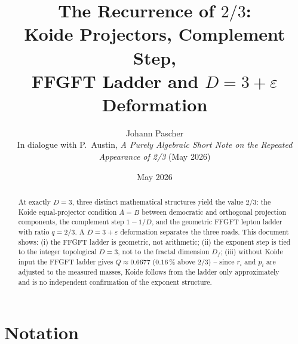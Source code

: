 
\title{The Recurrence of \(2/3\):\\[0.4em]
\large Koide Projectors, Complement Step,\\
FFGFT Ladder and \(D = 3+\varepsilon\) Deformation}
\author{Johann Pascher\\[0.3em]
\small In dialogue with P.~Austin,
\textit{A Purely Algebraic Short Note on the Repeated Appearance of 2/3}
(May 2026)}
\date{May 2026}
\maketitle

\begin{abstract}
At exactly \(D = 3\), three distinct mathematical structures yield the
value \(2/3\): the Koide equal-projector condition \(A = B\) between
democratic and orthogonal projection components,
the complement step \(1 - 1/D\),
and the geometric FFGFT lepton ladder with ratio \(q = 2/3\).
A \(D = 3+\varepsilon\) deformation separates the three roads.
This document shows:
(i) the FFGFT ladder is geometric, not arithmetic;
(ii) the exponent step is tied to the integer topological \(D=3\),
not to the fractal dimension \(D_f\);
(iii) without Koide input the FFGFT ladder gives \(Q \approx 0.6677\)
(\(0.16\,\%\) above \(2/3\)) --
since \(r_i\) and \(p_i\) are adjusted to the measured masses, Koide follows
from the ladder only approximately and is no independent confirmation
of the exponent structure.
\end{abstract}

\tableofcontents

\section*{Notation}

